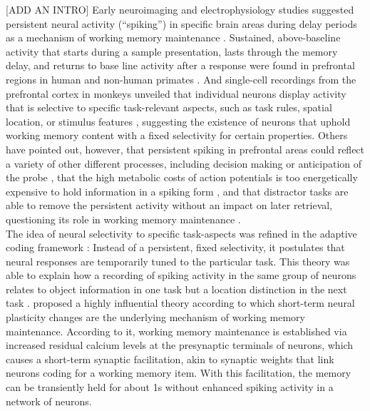 [ADD AN INTRO]
Early neuroimaging and electrophysiology studies suggested persistent neural activity (``spiking'') in specific brain areas during delay periods as a mechanism of working memory maintenance \citep{goldman1995cellular}.
Sustained, above-baseline activity that starts during a sample presentation, lasts through the memory delay, and returns to base line activity after a response were found in prefrontal regions in human \citep[e.g.,][]{courtney1997transient} and non-human primates \citep[e.g.,][]{fuster1971neuron, funahashi1989mnemonic, miller1996neural}.
And single-cell recordings from the prefrontal cortex in monkeys unveiled that individual neurons display activity that is selective to specific task-relevant aspects, such as task rules, spatial location, or stimulus features \citep{white1999rule, wallis2001single}, suggesting the existence of neurons that uphold working memory content with a fixed selectivity for certain properties.
Others have pointed out, however, that persistent spiking in prefrontal areas could reflect a variety of other different processes, including decision making \citep{curtis2010beyond} or anticipation of the probe \citep{nobre2011attention}, that the high metabolic costs of action potentials is too energetically expensive to hold information in a spiking form \citep{attwell2001energy}, and that distractor tasks are able to remove the persistent activity without an impact on later retrieval, questioning its role in working memory maintenance \citep{larocque2013decoding, lewis2015neural}.\\
The idea of neural selectivity to specific task-aspects was refined in the adaptive coding framework \citep{duncan2001adaptive}:
Instead of a persistent, fixed selectivity, it postulates that neural responses are temporarily tuned to the particular task. This theory was able to explain how a recording of spiking activity in the same group of neurons relates to object information in one task but a location distinction in the next task \citep{duncan2001adaptive}.
\citet{mongillo2008synaptic} proposed a highly influential theory according to which short-term neural plasticity changes are the underlying mechanism of working memory maintenance.
According to it, working memory maintenance is established via increased residual calcium levels at the presynaptic terminals of neurons, which causes a short-term synaptic facilitation, akin to synaptic weights that link neurons coding for a working memory item.
With this facilitation, the memory can be transiently held for about 1s without enhanced spiking activity in a network of neurons.
